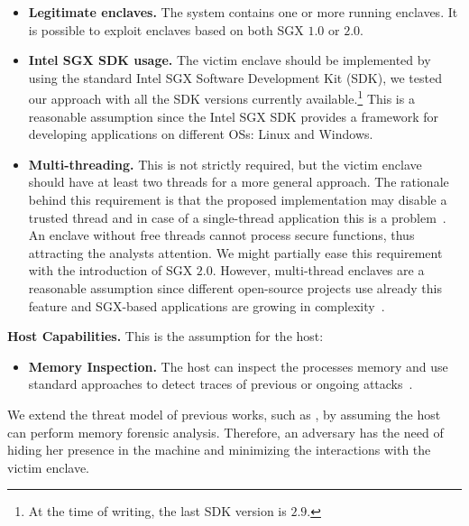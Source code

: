 \begin{itemize}
	\item \textbf{Legitimate enclaves.} 
	The system contains one or more running enclaves.
	It is possible to exploit enclaves based on both SGX $1.0$ or $2.0$.
	\item \textbf{Intel SGX SDK usage.} 
	The victim enclave should be implemented by using the standard Intel SGX 
	Software Development Kit (SDK), we tested our approach with all the SDK 
	versions currently available.\footnote{At the time of writing, the last SDK 
		version is $2.9$.}
	This is a reasonable assumption since the Intel SGX SDK provides a 
	framework for developing applications on different OSs: Linux and Windows.
	\item \textbf{Multi-threading.}
	This is not strictly required, but the victim enclave should have
	at least two threads for a more general approach.
	The rationale behind this requirement is that the proposed implementation 
	may disable a trusted thread and in case of a single-thread application 
	this is a problem~\citep{intel-developer-guide}.  
	An enclave without free threads cannot process secure functions, thus 
	attracting the analysts attention.
	We might partially ease this requirement with the introduction of SGX 
	$2.0$. 
	However, multi-thread enclaves are a reasonable assumption since different 
	open-source projects use already this feature and SGX-based applications 
	are growing in complexity~\citep{sqlite-sgx,sgxtor,signal,203255,stealthdb}.
\end{itemize}

\textbf{Host Capabilities.}
This is the assumption for the host:

\begin{itemize}
	\item \textbf{Memory Inspection.}  The host can inspect the 
	processes memory and use standard approaches to detect traces of previous
	or ongoing 
	attacks~\citep{stancill2013check,polychronakis2011rop,kittel2015counteracting,Graziano:2016:RFA:2897845.2897894}.
\end{itemize}

We extend the threat model of previous works, such as \cite{biondo2018guard},
by assuming the host can perform memory forensic analysis.
Therefore, an adversary has the need of hiding her presence in the machine 
and minimizing the interactions with the victim enclave.

